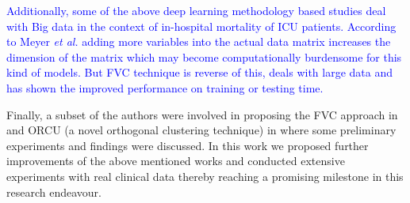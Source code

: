 \textcolor{blue}{Additionally, some of the above deep learning methodology based studies deal with Big data in the context of in-hospital mortality of ICU patients. According to Meyer \textit{et al.} \cite{Meyer2018} adding more variables into the actual data matrix increases the dimension of the matrix which may become computationally burdensome for this kind of models. But FVC technique \cite{mehedy-masud:2017:fvc} is reverse of this, deals with large data and has shown the improved performance on training or testing time.}

Finally, a subset of the authors were involved in proposing the FVC approach in \cite{mehedy-masud:2017:fvc} and ORCU (a novel orthogonal clustering technique) in \cite{mehedy-masud:2018:frmwrk} where some preliminary experiments and findings were discussed. In this work we proposed further improvements of the above mentioned works and conducted extensive experiments with real clinical data thereby reaching a promising milestone in this research endeavour.


